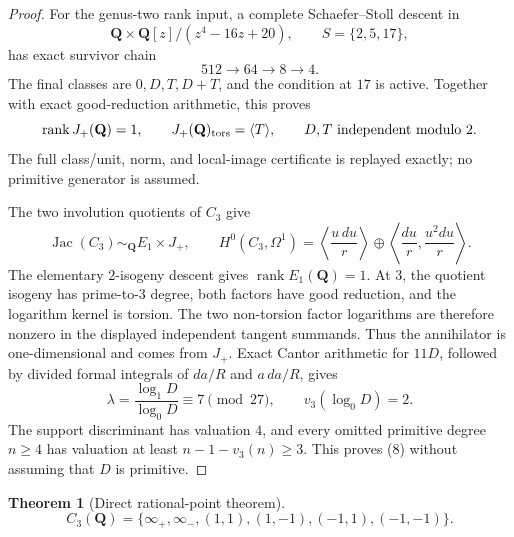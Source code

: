 \documentclass[11pt]{article}
\newtheorem{theorem}{Theorem}
\newcommand{\Q}{\mathbf Q}
\begin{document}
\begin{proof}
For the genus-two rank input, a complete Schaefer--Stoll descent in
\[
 \Q\times\Q[z]/(z^4-16z+20),\qquad S=\{2,5,17\},
\]
has exact survivor chain
\[
 512\longrightarrow64\longrightarrow8\longrightarrow4.
\]
The final classes are \(0,D,T,D+T\), and the condition at \(17\) is active.
Together with exact good-reduction arithmetic, this proves
\[
 \operatorname{rank}J_+(\Q)=1,\qquad
 J_+(\Q)_{\rm tors}=\langle T\rangle,\qquad
 D,T\text{ independent modulo }2.
\]
The full class/unit, norm, and local-image certificate is replayed exactly;
no primitive generator is assumed.

The two involution quotients of $C_3$ give
\[
 \operatorname{Jac}(C_3)\sim_\Q E_1\times J_+,\qquad
 H^0(C_3,\Omega^1)=
 \left\langle\frac{u\,du}{r}\right\rangle\oplus
 \left\langle\frac{du}{r},\frac{u^2du}{r}\right\rangle.
\]
The elementary $2$-isogeny descent gives
\(\operatorname{rank}E_1(\Q)=1\).  At \(3\), the quotient isogeny has
prime-to-\(3\) degree, both factors have good reduction, and the logarithm
kernel is torsion.  The two non-torsion factor logarithms are therefore
nonzero in the displayed independent tangent summands.  Thus the annihilator
is one-dimensional and comes from $J_+$.  Exact Cantor arithmetic for $11D$,
followed by
divided formal integrals of $da/R$ and $a\,da/R$, gives
\[
 \lambda=\frac{\log_1D}{\log_0D}\equiv7\pmod {27},
 \qquad v_3(\log_0D)=2.
\]
The support discriminant has valuation $4$, and every omitted primitive
degree $n\ge4$ has valuation at least
$n-1-v_3(n)\ge3$.  This proves (8) without assuming that $D$ is primitive.
\end{proof}

\begin{theorem}[Direct rational-point theorem]\label{thm:c3}
\[
 C_3(\Q)=
 \{\infty_+,\infty_-,(1,1),(1,-1),(-1,1),(-1,-1)\}. \tag{9}
\]
\end{theorem}
\end{document}
